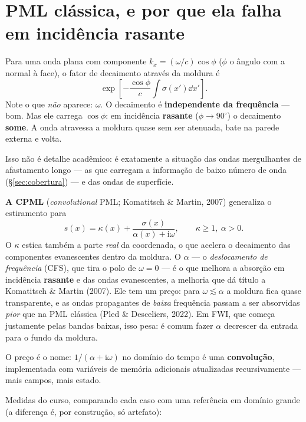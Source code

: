 \documentclass[11pt,a4paper,oneside]{report}
\begin{document}
\section{PML cl\'assica, e por que ela falha em incid\^encia rasante}

\begin{teoria}
Para uma onda plana com componente $k_x = (\omega/c)\cos\phi$ ($\phi$ o
\^angulo com a normal \`a face), o fator de decaimento atrav\'es da moldura
\'e
\[
\exp\!\left[-\frac{\cos\phi}{c}\int \sigma(x')\dd x'\right].
\]
Note o que \emph{n\~ao} aparece: $\omega$. O decaimento \'e
\textbf{independente da frequ\^encia} --- bom. Mas ele carrega
$\cos\phi$: em incid\^encia \textbf{rasante} ($\phi \to 90^\circ$) o
decaimento \textbf{some}. A onda atravessa a moldura quase sem ser atenuada,
bate na parede externa e volta.

Isso n\~ao \'e detalhe acad\^emico: \'e exatamente a situa\c{c}\~ao das ondas
mergulhantes de afastamento longo --- as que carregam a informa\c{c}\~ao de
baixo n\'umero de onda (§\ref{sec:cobertura}) --- e das ondas de superf\'icie.

\textbf{A CPML} (\emph{convolutional} PML; Komatitsch \& Martin, 2007)
generaliza o estiramento para
\[
s(x) = \kappa(x) + \frac{\sigma(x)}{\alpha(x) + \mathrm{i}\omega},
\qquad \kappa \ge 1,\ \alpha > 0 .
\]
O $\kappa$ estica tamb\'em a parte \emph{real} da coordenada, o que acelera o
decaimento das componentes evanescentes dentro da moldura. O $\alpha$ --- o
\emph{deslocamento de frequ\^encia} (CFS), que tira o polo de $\omega = 0$ ---
\'e o que melhora a absor\c{c}\~ao em incid\^encia \textbf{rasante} e das ondas
evanescentes, a melhoria que d\'a t\'itulo a Komatitsch \& Martin (2007). Ele
tem um pre\c{c}o: para $\omega \lesssim \alpha$ a moldura fica quase
transparente, e as ondas propagantes de \emph{baixa} frequ\^encia passam a ser
absorvidas \emph{pior} que na PML cl\'assica (Pled \& Desceliers, 2022). Em FWI,
que come\c{c}a justamente pelas bandas baixas, isso pesa: \'e comum fazer
$\alpha$ decrescer da entrada para o fundo da moldura.

O pre\c{c}o \'e o nome: $1/(\alpha+\mathrm{i}\omega)$ no dom\'inio do tempo
\'e uma \textbf{convolu\c{c}\~ao}, implementada com vari\'aveis de mem\'oria
adicionais atualizadas recursivamente --- mais campos, mais estado.
\end{teoria}

Medidas do curso, comparando cada caso com uma refer\^encia em dom\'inio
grande (a diferen\c{c}a \'e, por constru\c{c}\~ao, s\'o artefato):
\end{document}
